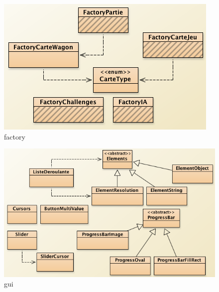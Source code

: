 \documentclass{report}
\begin{document}
\begin{figure}[H]
\center
\includegraphics{factory.png}
\caption{factory}
\label{factory}
\end{figure}
\begin{figure}[H]
\center
\includegraphics[width=480pt]{gui.png}
\caption{gui}
\label{gui}
\end{figure}
\end{document}
